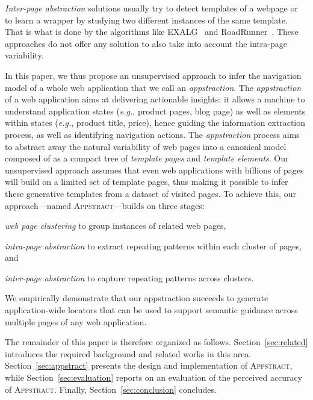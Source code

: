 \message{ !name(appstract.tex)}\documentclass[sigconf,authordraft]{acmart}
\theoremstyle{definition}
\begin{document}
\emph{Inter-page abstraction} solutions usually try to detect templates of a webpage or to learn a wrapper by studying two different instances of the same template.
That is what is done by the algorithms like EXALG~\cite{ArasuExtractingPages} and RoadRunner~\cite{Crescenzi2001RoadRunner:Sites}. These approaches do not offer any solution to also take into account the intra-page variability.

In this paper, we thus propose an unsupervised approach to infer the navigation model of a whole web application that we call an \textit{appstraction}.
The \textit{appstraction} of a web application aims at delivering actionable insights: it allows a machine to understand application states (\emph{e.g.}, product pages, blog page) as well as elements within states (\emph{e.g.}, product title, price), hence guiding the information extraction process, as well as identifying navigation actions.
The \textit{appstraction} process aims to abstract away the natural variability of web pages into a canonical model composed of as a compact tree of \emph{template pages} and \emph{template elements}.
Our unsupervised approach assumes that even web applications with billions of pages will build on a limited set of template pages, thus making it possible to infer these generative templates from a dataset of visited pages.
To achieve this, our approach---named \textsc{Appstract}---builds on three stages:
\begin{inparaenum}
    \item \textit{web page clustering} to group instances of related web pages,
    \item \textit{intra-page abstraction} to extract repeating patterns within each cluster of pages, and
    \item \textit{inter-page abstraction} to capture repeating patterns across clusters.
\end{inparaenum}

We empirically demonstrate that our appstraction succeeds to generate application-wide locators that can be used to support semantic guidance across multiple pages of any web application.

The remainder of this paper is therefore organized as follows.
Section~\ref{sec:related} introduces the required background and related works in this area.
Section~\ref{sec:appstract} presents the design and implementation of \textsc{Appstract}, while Section~\ref{sec:evaluation} reports on an evaluation of the perceived accuracy of \textsc{Appstract}.
Finally, Section~\ref{sec:conclusion} concludes.


\end{document}
